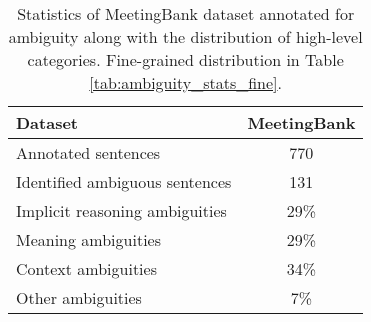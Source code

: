 \begin{table}
\centering
\begin{tabular}{@{}l|c@{}}
\toprule
Dataset                       & MeetingBank \\ \midrule
Annotated sentences          & 770         \\
Identified ambiguous sentences & 131         \\ \midrule
Implicit reasoning ambiguities & 29\% \\
Meaning ambiguities & 29\% \\
Context ambiguities & 34\% \\
Other ambiguities & 7\% \\
\bottomrule
\end{tabular}
\vspace*{-0.2cm}
\caption{Statistics of MeetingBank dataset annotated for ambiguity along with the distribution of high-level categories. Fine-grained distribution in Table \ref{tab:ambiguity_stats_fine}.}
\label{tab:ambiguity_stats}
\vspace*{-0.0cm}
\end{table}